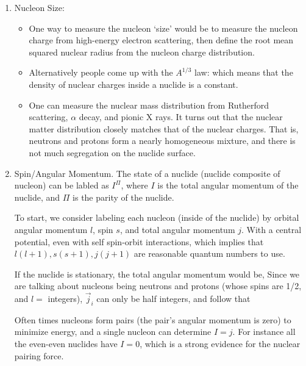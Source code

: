 \documentclass{school-22.101-notes}
\begin{document}
\begin{enumerate}
\item Nucleon Size: 
  \begin{itemize}
  \item One way to measure the nucleon `size' would be to measure the nucleon charge from high-energy electron scattering, then define the root mean squared nuclear radius from the nucleon charge distribution. 

  \item Alternatively people come up with the $A^{1/3}$ law: 
    which means that the density of nuclear charges inside a nuclide is a constant. 

  \item One can measure the nuclear mass distribution from Rutherford scattering, $\alpha$ decay, and pionic X rays. It turns out that the nuclear matter distribution closely matches that of the nuclear charges. That is, neutrons and protons form a nearly homogeneous mixture, and there is not much segregation on the nuclide surface. 
  \end{itemize}

\item Spin/Angular Momentum. The state of a nuclide (nuclide composite of nucleon) can be labled as $\boxed{I^{\Pi}}$, where $I$ is the total angular momentum of the nuclide, and $\Pi$ is the parity of the nuclide. 

To start, we consider labeling each nucleon (inside of the nuclide) by orbital angular momentum $l$, spin $s$, and total angular momentum $j$. With a central potential, even with self spin-orbit interactions, 
which implies that $l(l+1), s(s+1), j(j+1)$ are reasonable quantum numbers to use. 

If the nuclide is stationary, the total angular momentum would be, 
Since we are talking about nucleons being neutrons and protons (whose spins are 1/2, and $l =$ integers), $\vec{j}_i$ can only be half integers, and follow that 

Often times nucleons form pairs (the pair's angular momentum is zero) to minimize energy, and a single nucleon can determine $I = j$. For instance all the even-even nuclides have $I=0$, which is a strong evidence for the nuclear pairing force. 


\end{enumerate}
\end{document}
